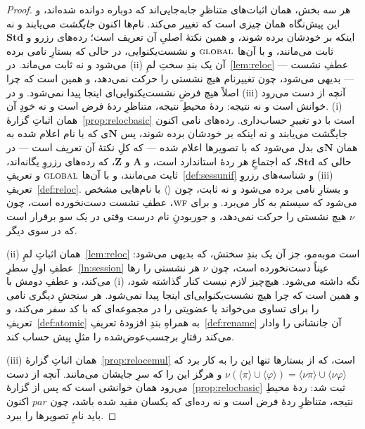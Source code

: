 \documentclass[10pt,oneside,openany]{book}
\newcommand{\admits}{\mathbf{N}}
\newcommand{\Apid}{\mathbf{A}}
\newcommand{\Zpid}{\mathbf{Z}}
\newcommand{\Stdpid}{\mathbf{Std}}
\newcommand{\pars}{\mathit{par}}
\newcommand{\WF}{\op{wf}}
\newcommand{\op}[1]{\textnormal{\textsc{#1}}}
\newcommand{\ncl}[1]{\langle #1 \rangle}
\theoremstyle{accentdef}
\theoremstyle{accentplain}
\begin{document}
\begin{proof}
هر سه بخش، همان اثبات‌های متناظرِ جابه‌جایی‌اند که دوباره دوانده شده‌اند، و
این پیش‌نگاه همان چیزی است که تغییر می‌کند. نام‌ها اکنون \emph{جایگشت}
می‌یابند و نه اینکه بر خودشان برده شوند، و همین نکتهٔ اصلیِ آن تعریف است؛
رده‌های رزرو و $\Stdpid$ ثابت می‌مانند، و با آن‌ها $\op{global}$ و
نشست‌یکنوایی، در حالی که بستارِ نامی برده می‌شود و نه ثابت می‌ماند. در (ii)
آن یک بندِ سختِ لمِ~\ref{lem:reloc} --- عطفِ نشست --- بدیهی می‌شود، چون
تغییرنام هیچ نشستی را حرکت نمی‌دهد، و همین است که چرا اصلاً هیچ فرضِ
نشست‌یکنوایی‌ای اینجا پیدا نمی‌شود. و در (iii) آنچه از دست می‌رود خوانش است
و نه نتیجه: ردهٔ محیطِ نتیجه، متناظرِ ردهٔ فرض است و نه خودِ آن.
(i) همان اثباتِ گزارهٔ~\ref{prop:relocbasic} است با دو تغییرِ حساب‌داری.
رده‌های نامی اکنون جایگشت می‌یابند و نه اینکه بر خودشان برده شوند، پس
$\admits$ی که با نام اعلام شده به همان $\admits$ی بدل می‌شود که با تصویرها
اعلام شده --- که کلِ نکتهٔ آن تعریف است --- در حالی که $\Stdpid$، که اجتماعِ
هر ردهٔ استاندارد است، و $\Apid$ و $\Zpid$، که رده‌های رزروِ یگانه‌اند، ثابت
می‌مانند، و با آن‌ها $\op{global}$ و تعریفِ~\ref{def:sessunif} و شناسه‌های
رزروِ (iii)ِ تعریفِ~\ref{def:reloc}. و بستارِ نامی برده می‌شود و نه ثابت،
چون $\ncl{}$ با نام‌هایی مشخص می‌شود که سیستم به کار می‌برد. و برای $\WF$،
عطفِ نشست دست‌نخورده است، چون $\nu$ هیچ نشستی را حرکت نمی‌دهد، و جور‌بودنِ
نام درست وقتی در یک سو برقرار است که در سوی دیگر.

(ii) همان اثباتِ لمِ~\ref{lem:reloc} است مو‌به‌مو، جز آن یک بندِ سختش، که
بدیهی می‌شود: عطفِ اولِ سطرِ~\ref{ln:session} عیناً دست‌نخورده است، چون
$\nu$ هر نشستی را رها می‌کند، و عطفِ دومش با (i) نگه داشته می‌شود. هیچ‌چیز
لازم نیست کنار گذاشته شود، و همین است که چرا هیچ نشست‌یکنوایی‌ای اینجا پیدا
نمی‌شود. هر سنجشِ دیگری نامی را برای تساوی می‌خواند یا عضویتی را در
مجموعه‌ای که با کد سفر می‌کند، و تعریفِ~\ref{def:atomic} به همراهِ بندِ
افزودهٔ تعریفِ~\ref{def:rename} آن جانشانی را وادار می‌کند رفتارِ
برچسب‌عوض‌شده را مثلِ پیش حساب کند.

(iii) همان اثباتِ گزارهٔ~\ref{prop:relocemul} است، که از بستارها تنها این را
به کار برد که $\nu(\ncl{\pi} \cup \ncl{\varphi}) = \ncl{\nu\pi} \cup
\ncl{\nu\varphi}$ و هرگز این را که سرِ جایشان می‌مانند. آنچه از دست می‌رود
همان خوانشی است که پس از گزارهٔ~\ref{prop:relocbasic} ثبت شد: ردهٔ محیطِ
نتیجه، متناظرِ ردهٔ فرض است و نه رده‌ای که یکسان مقید شده باشد، چون $\pars$
اکنون باید نامِ تصویرها را ببرد.
\end{proof}
\end{document}
